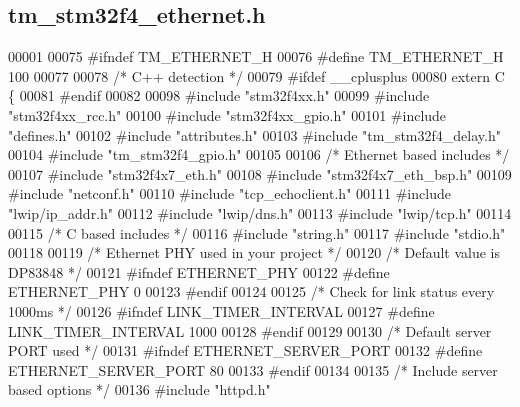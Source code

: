 \hypertarget{tm__stm32f4__ethernet_8h_source}{}\subsection{tm\+\_\+stm32f4\+\_\+ethernet.\+h}

\begin{DoxyCode}
00001 
00075 \textcolor{preprocessor}{#ifndef TM\_ETHERNET\_H}
00076 \textcolor{preprocessor}{#define TM\_ETHERNET\_H 100}
00077 
00078 \textcolor{comment}{/* C++ detection */}
00079 \textcolor{preprocessor}{#ifdef \_\_cplusplus}
00080 \textcolor{keyword}{extern} C \{
00081 \textcolor{preprocessor}{#endif}
00082 
00098 \textcolor{preprocessor}{#include "stm32f4xx.h"}
00099 \textcolor{preprocessor}{#include "stm32f4xx\_rcc.h"}
00100 \textcolor{preprocessor}{#include "stm32f4xx\_gpio.h"}
00101 \textcolor{preprocessor}{#include "defines.h"}
00102 \textcolor{preprocessor}{#include "attributes.h"}
00103 \textcolor{preprocessor}{#include "tm\_stm32f4\_delay.h"}
00104 \textcolor{preprocessor}{#include "tm\_stm32f4\_gpio.h"}
00105 
00106 \textcolor{comment}{/* Ethernet based includes */}
00107 \textcolor{preprocessor}{#include "stm32f4x7\_eth.h"}
00108 \textcolor{preprocessor}{#include "stm32f4x7\_eth\_bsp.h"}
00109 \textcolor{preprocessor}{#include "netconf.h"}
00110 \textcolor{preprocessor}{#include "tcp\_echoclient.h"}
00111 \textcolor{preprocessor}{#include "lwip/ip\_addr.h"}
00112 \textcolor{preprocessor}{#include "lwip/dns.h"}
00113 \textcolor{preprocessor}{#include "lwip/tcp.h"}
00114 
00115 \textcolor{comment}{/* C based includes */}
00116 \textcolor{preprocessor}{#include "string.h"}
00117 \textcolor{preprocessor}{#include "stdio.h"}
00118 
00119 \textcolor{comment}{/* Ethernet PHY used in your project */}
00120 \textcolor{comment}{/* Default value is DP83848 */}
00121 \textcolor{preprocessor}{#ifndef ETHERNET\_PHY}
00122 \textcolor{preprocessor}{#define ETHERNET\_PHY                        0}
00123 \textcolor{preprocessor}{#endif}
00124 
00125 \textcolor{comment}{/* Check for link status every 1000ms */}
00126 \textcolor{preprocessor}{#ifndef LINK\_TIMER\_INTERVAL}
00127 \textcolor{preprocessor}{#define LINK\_TIMER\_INTERVAL                 1000}
00128 \textcolor{preprocessor}{#endif}
00129 
00130 \textcolor{comment}{/* Default server PORT used */}
00131 \textcolor{preprocessor}{#ifndef ETHERNET\_SERVER\_PORT}
00132 \textcolor{preprocessor}{#define ETHERNET\_SERVER\_PORT                80}
00133 \textcolor{preprocessor}{#endif}
00134 
00135 \textcolor{comment}{/* Include server based options */}
00136 \textcolor{preprocessor}{#include "httpd.h"}

\end{DoxyCode}
